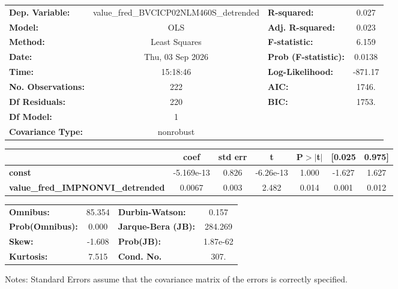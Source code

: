 \begin{center}
\begin{tabular}{lclc}
\toprule
\textbf{Dep. Variable:}                   & value\_fred\_BVCICP02NLM460S\_detrended & \textbf{  R-squared:         } &     0.027   \\
\textbf{Model:}                           &                   OLS                   & \textbf{  Adj. R-squared:    } &     0.023   \\
\textbf{Method:}                          &              Least Squares              & \textbf{  F-statistic:       } &     6.159   \\
\textbf{Date:}                            &             Thu, 03 Sep 2026            & \textbf{  Prob (F-statistic):} &   0.0138    \\
\textbf{Time:}                            &                 15:18:46                & \textbf{  Log-Likelihood:    } &   -871.17   \\
\textbf{No. Observations:}                &                     222                 & \textbf{  AIC:               } &     1746.   \\
\textbf{Df Residuals:}                    &                     220                 & \textbf{  BIC:               } &     1753.   \\
\textbf{Df Model:}                        &                       1                 & \textbf{                     } &             \\
\textbf{Covariance Type:}                 &                nonrobust                & \textbf{                     } &             \\
\bottomrule
\end{tabular}
\begin{tabular}{lcccccc}
                                          & \textbf{coef} & \textbf{std err} & \textbf{t} & \textbf{P$> |$t$|$} & \textbf{[0.025} & \textbf{0.975]}  \\
\midrule
\textbf{const}                            &   -5.169e-13  &        0.826     & -6.26e-13  &         1.000        &       -1.627    &        1.627     \\
\textbf{value\_fred\_IMPNONVI\_detrended} &       0.0067  &        0.003     &     2.482  &         0.014        &        0.001    &        0.012     \\
\bottomrule
\end{tabular}
\begin{tabular}{lclc}
\textbf{Omnibus:}       & 85.354 & \textbf{  Durbin-Watson:     } &    0.157  \\
\textbf{Prob(Omnibus):} &  0.000 & \textbf{  Jarque-Bera (JB):  } &  284.269  \\
\textbf{Skew:}          & -1.608 & \textbf{  Prob(JB):          } & 1.87e-62  \\
\textbf{Kurtosis:}      &  7.515 & \textbf{  Cond. No.          } &     307.  \\
\bottomrule
\end{tabular}
\end{center}

Notes: \newline
 [1] Standard Errors assume that the covariance matrix of the errors is correctly specified.